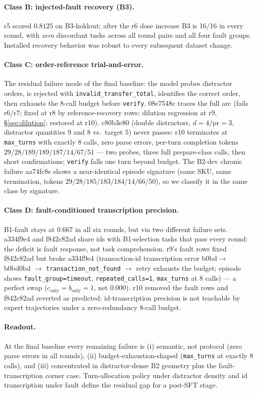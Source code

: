 \paragraph{Class B: injected-fault recovery (B3).}
r5 scored $0.8125$ on B3-holdout; after the r6 dose increase B3 is 16/16 in every
round, with \emph{zero} discordant tasks across all round pairs and all four fault
groups. Installed recovery behavior was robust to every subsequent dataset change.

\paragraph{Class C: order-reference trial-and-error.}
The residual failure mode of the final baseline: the model probes distractor
orders, is rejected with \texttt{invalid\_transfer\_total}, identifies the correct
order, then exhausts the 8-call budget before \texttt{verify}. 08e7548c traces the
full arc (fails r6/r7; fixed at r8 by reference-recovery rows; dilution regression
at r9, \S\ref{sec:dilution}; restored at r10). c80b3e80 (double distractors,
$d{=}4/\mathrm{pr}{=}3$, distractor quantities 9 and 8 vs.\ target 5) never
passes: r10 terminates at \texttt{max\_turns} with exactly 8 calls, zero parse
errors, per-turn completion tokens $29/28/189/189/187/14/67/51$ --- two probes,
three full prepare-class calls, then short confirmations; \texttt{verify} falls one
turn beyond budget. The B2-dev chronic failure aa74fc8e shows a near-identical
episode signature (same SKU, same termination, tokens
$29/28/185/183/184/14/66/50$), so we classify it in the same class by signature.

\paragraph{Class D: fault-conditioned transcription precision.}
B1-fault stays at $0.667$ in all six rounds, but via two different failure sets.
a334f9e4 and f842c82ad share ids with B1-selection tasks that pass every round:
the deficit is fault response, not task comprehension. r9's fault rows fixed
f842c82ad but broke a334f9e4 (transaction-id transcription error
b0bd$\to$b0bd0bd $\to$ \texttt{transaction\_not\_found} $\to$ retry exhausts the
budget; episode shows \texttt{fault\_group=timeout}, \texttt{repeated\_calls=1},
\texttt{max\_turns} at 8 calls) --- a perfect swap
($c_{\text{only}}{=}b_{\text{only}}{=}1$, net $0.000$). r10 removed the fault rows
and f842c82ad reverted as predicted: id-transcription precision is not teachable
by expert trajectories under a zero-redundancy 8-call budget.

\paragraph{Readout.}
At the final baseline every remaining failure is (i) semantic, not protocol (zero
parse errors in all rounds), (ii) budget-exhaustion-shaped (\texttt{max\_turns} at
exactly 8 calls), and (iii) concentrated in distractor-dense B2 geometry plus the
fault-transcription corner case. Turn-allocation policy under distractor density
and id transcription under fault define the residual gap for a post-SFT stage.
